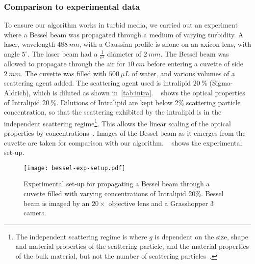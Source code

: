 \FloatBarrier

\subsubsection*{Comparison to experimental data}

To ensure our algorithm works in turbid media, we carried out an experiment where a Bessel beam was propagated through a medium of varying turbidity.
A laser, wavelength $488~nm$, with a Gaussian profile is shone on an axicon lens, with angle $5^{\circ}$.
The laser beam had a $\tfrac{1}{e^2}$ diameter of $2~mm$. 
The Bessel beam was allowed to propagate through the air for $10~cm$ before entering a cuvette of side $2~mm$.
The cuvette was filled with $500~\mu L$ of water, and various volumes of a scattering agent added.
The scattering agent used is intralipid $20~\%$ (Sigma-Aldrich), which is diluted as shown in~\cref{tab:intra}.
~ shows the optical properties of Intralipid $20~\%$.
Dilutions of Intralipid are kept below 2\% scattering particle concentration, so that the scattering exhibited by the intralipid is in the independent scattering regime\footnote{The independent scattering regime is where $g$ is dependent on the size, shape and material properties of the scattering particle, and the material properties of the bulk material, but not the number of scattering particles~\cite{aernouts2013supercontinuum,mishchenko2018independent}.}.
This allows the linear scaling of the optical properties by concentrations~\cite{aernouts2013supercontinuum,vardaki2015studying,di2011effect}.
Images of the Bessel beam as it emerges from the cuvette are taken for comparison with our algorithm.
~ shows the experimental set-up.

\begin{figure}[ht!]
    \centering
    \texttt{[image: bessel-exp-setup.pdf]}
    \caption{Experimental set-up for propagating a Bessel beam through a cuvette filled with varying concentrations of Intralipid 20\%. Bessel beam is imaged by an $20\times$ objective lens and a Grasshopper 3 camera.}
    \label{fig:expsetup}
\end{figure}


